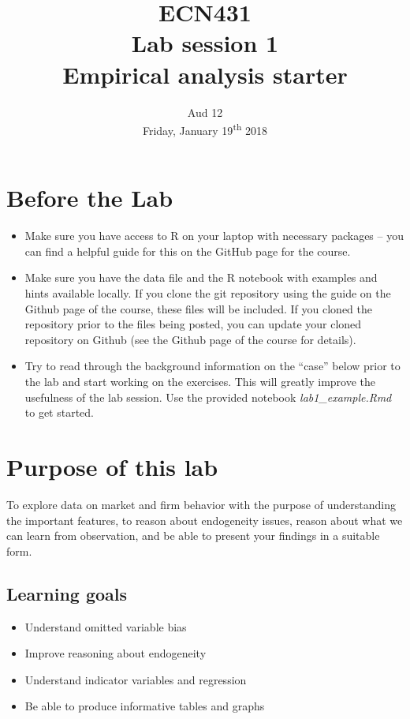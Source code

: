 \documentclass[12pt,a4paper]{article}
\title{ECN431\\Lab session 1\\Empirical analysis starter}
\date{Aud 12 \\ Friday, January 19\textsuperscript{th} 2018}
\begin{document}
\maketitle

\section*{Before the Lab}
\begin{itemize}
\item Make sure you have access to R on your laptop with necessary packages -- you can find a helpful guide for this on the GitHub page for the course.
\item Make sure you have the data file and the R notebook with examples and hints available locally. If you clone the git repository using the guide on the Github page of the course, these files will be included. If you cloned the repository prior to the files being posted, you can update your cloned repository on Github (see the Github page of the course for details).
\item Try to read through the background information on the ``case'' below prior to the lab and start working on the exercises. This will greatly improve the usefulness of the lab session. Use the provided notebook \emph{lab1_example.Rmd} to get started.
\end{itemize}

\section*{Purpose of this lab}
To explore data on market and firm behavior with the purpose of understanding the important features, to reason about endogeneity issues, reason about what we can learn from observation, and be able to present your findings in a suitable form.

\subsection*{Learning goals}
\begin{itemize}
\item	Understand omitted variable bias
\item	Improve reasoning about endogeneity
\item	Understand indicator variables and regression
\item	Be able to produce informative tables and graphs
\end{itemize}
\end{document}
